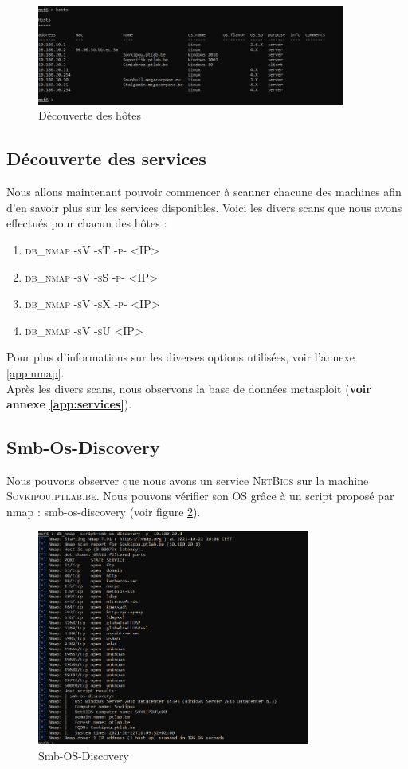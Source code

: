 \documentclass[a4paper]{article}
\begin{document}
\begin{figure}[H]
    \centering
    \includegraphics[width=0.90\textwidth]{images/lab2/hosts.png}
    \caption{Découverte des hôtes}
    \label{fig:hosts}
\end{figure}

\subsection{Découverte des services}
Nous allons maintenant pouvoir commencer à scanner chacune des machines afin d'en savoir plus sur les services disponibles. Voici les divers scans que nous avons effectués pour chacun des hôtes :
\begin{enumerate}
    \item \textsc{db\_nmap  -sV -sT -p- <IP>}
    \item \textsc{db\_nmap  -sV -sS -p- <IP>}
    \item \textsc{db\_nmap  -sV -sX -p- <IP>}
    \item \textsc{db\_nmap  -sV -sU <IP>}
\end{enumerate}
Pour plus d'informations sur les diverses options utilisées, voir l'annexe \ref{app:nmap}.\\

Après les divers scans, nous observons la base de données metasploit (\textbf{voir annexe \ref{app:services}}). 

\subsection{Smb-Os-Discovery}
Nous pouvons observer que nous avons un service \textsc{NetBios} sur la machine \textsc{Sovkipou.ptlab.be}. Nous pouvons vérifier son OS grâce à un script proposé par nmap : smb-os-discovery (voir figure \ref{fig:smb-os-discovery}).
\begin{figure}[H]
    \centering
    \includegraphics[width=0.80\textwidth]{images/lab2/smb.png}
    \caption{Smb-OS-Discovery}
    \label{fig:smb-os-discovery}
\end{figure}
\end{document}
